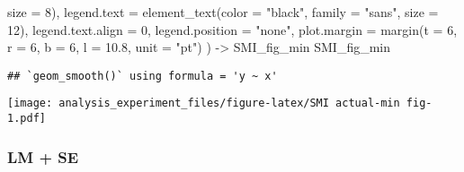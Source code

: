 \documentclass[
]{article}
\newenvironment{Shaded}{\begin{snugshade}}{\end{snugshade}}
\newcommand{\AttributeTok}[1]{\textcolor[rgb]{0.77,0.63,0.00}{#1}}
\newcommand{\DecValTok}[1]{\textcolor[rgb]{0.00,0.00,0.81}{#1}}
\newcommand{\FloatTok}[1]{\textcolor[rgb]{0.00,0.00,0.81}{#1}}
\newcommand{\FunctionTok}[1]{\textcolor[rgb]{0.00,0.00,0.00}{#1}}
\newcommand{\NormalTok}[1]{#1}
\newcommand{\OtherTok}[1]{\textcolor[rgb]{0.56,0.35,0.01}{#1}}
\newcommand{\StringTok}[1]{\textcolor[rgb]{0.31,0.60,0.02}{#1}}
\begin{document}
\begin{Shaded}
\begin{Highlighting}[]
                                 \AttributeTok{size =} \DecValTok{8}\NormalTok{),}
        \AttributeTok{legend.text =} \FunctionTok{element\_text}\NormalTok{(}\AttributeTok{color =} \StringTok{"black"}\NormalTok{, }
                                 \AttributeTok{family =} \StringTok{"sans"}\NormalTok{, }
                                 \AttributeTok{size =} \DecValTok{12}\NormalTok{),}
        \AttributeTok{legend.text.align =} \DecValTok{0}\NormalTok{,}
        \AttributeTok{legend.position =} \StringTok{"none"}\NormalTok{,}
        \AttributeTok{plot.margin =} \FunctionTok{margin}\NormalTok{(}\AttributeTok{t =} \DecValTok{6}\NormalTok{, }\AttributeTok{r =} \DecValTok{6}\NormalTok{, }\AttributeTok{b =} \DecValTok{6}\NormalTok{, }\AttributeTok{l =} \FloatTok{10.8}\NormalTok{, }\AttributeTok{unit =} \StringTok{"pt"}\NormalTok{)}
\NormalTok{) }\OtherTok{{-}\textgreater{}}\NormalTok{ SMI\_fig\_min}
\NormalTok{SMI\_fig\_min}
\end{Highlighting}
\end{Shaded}

\begin{verbatim}
## `geom_smooth()` using formula = 'y ~ x'
\end{verbatim}

\texttt{[image: analysis\_experiment\_files/figure-latex/SMI actual-min fig-1.pdf]}

\hypertarget{lm-se}{%
\subsubsection{LM + SE}\label{lm-se}}
\end{document}
